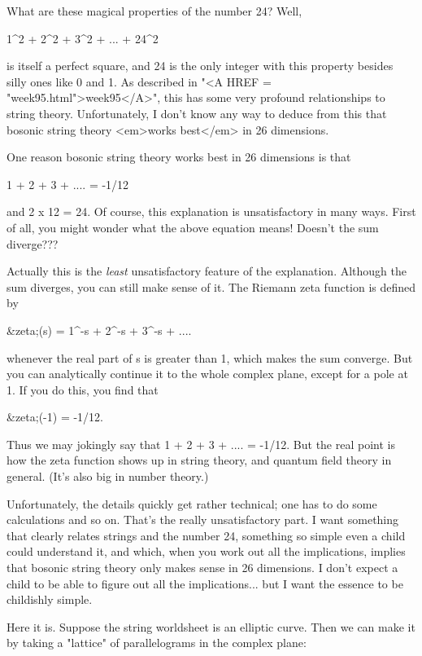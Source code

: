What are these magical properties of the number 24?  Well,

                    1^{2} + 2^{2} + 3^{2} + ... + 24^{2}

is itself a perfect square, and 24 is the only integer with this
property besides silly ones like 0 and 1.  As described in "<A HREF = "week95.html">week95</A>", this
has some very profound relationships to string theory.  Unfortunately, I
don't know any way to deduce from this that bosonic string theory <em>works
best</em> in 26 dimensions.  

One reason bosonic string theory works best in 26 dimensions is that

                    1 + 2 + 3 + .... = -1/12

and 2 x 12 = 24.  Of course, this explanation is unsatisfactory in many 
ways.  First of all, you might wonder what the above equation means!   
Doesn't the sum diverge???

Actually this is the \emph{least} unsatisfactory feature of the explanation.
Although the sum diverges, you can still make sense of it.  The Riemann
zeta function is defined by

                &zeta;(s) = 1^{-s} + 2^{-s} + 3^{-s} + ....

whenever the real part of s is greater than 1, which makes the sum
converge. But you can analytically continue it to the whole complex
plane, except for a pole at 1.  If you do this, you find that 

                       &zeta;(-1) = -1/12.  

Thus we may jokingly say that 1 + 2 + 3 + .... = -1/12.  But the
real point is how the zeta function shows up in string theory, and
quantum field theory in general.  (It's also big in number theory.)

Unfortunately, the details quickly get rather technical; one has to do
some calculations and so on.  That's the really unsatisfactory part. I
want something that clearly relates strings and the number 24, something
so simple even a child could understand it, and which, when you work out
all the implications, implies that bosonic string theory only makes
sense in 26 dimensions.   I don't expect a child to be able to figure
out all the implications... but I want the essence to be childishly
simple.

Here it is.  Suppose the string worldsheet is an elliptic curve.  Then we
can make it by taking a "lattice" of parallelograms in the complex plane:
                 
